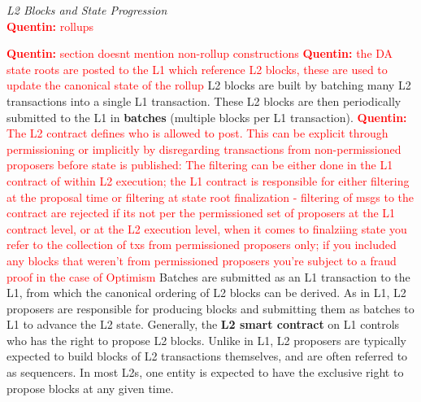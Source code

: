 \documentclass[a4paper]{article}
\theoremstyle{boldstyle}
\newcommand{\qb}[1]{\textcolor{red}{\textbf{Quentin:} #1}}
\begin{document}
    \textit{L2 Blocks and State Progression} \\
    \qb{rollups }



    
    \qb{section doesnt mention non-rollup constructions}
    \qb{the DA state roots are posted to the L1 which reference L2 blocks, these are used to update the canonical state of the rollup}
    L2 blocks are built by batching many L2 transactions into a single L1 transaction. These L2 blocks are then periodically submitted to the L1 in \textbf{batches} (multiple blocks per L1 transaction). 
    \qb{The L2 contract defines who is allowed to post. This can be explicit through permissioning or implicitly by disregarding transactions from non-permissioned proposers before state is published: The filtering can be either done in the L1 contract of within L2 execution; the L1 contract is responsible for either filtering at the proposal time or filtering at state root finalization - filtering of msgs to the contract are rejected if its not per the permissioned set of proposers at the L1 contract level, or at the L2 execution level, when it comes to finalziing state you refer to the collection of txs from permissioned proposers only; if you included any blocks that weren't from permissioned proposers you're subject to a fraud proof in the case of Optimism}
    Batches are submitted as an L1 transaction to the L1, from which the canonical ordering of L2 blocks can be derived. As in L1, L2 proposers are responsible for producing blocks and submitting them as batches to L1 to advance the L2 state. Generally, the \textbf{L2 smart contract} on L1 controls who has the right to propose L2 blocks. Unlike in L1, L2 proposers are typically expected to build blocks of L2 transactions themselves, and are often referred to as sequencers. In most L2s, one entity is expected to have the exclusive right to propose blocks at any given time. 
    \\
    
\end{document}
